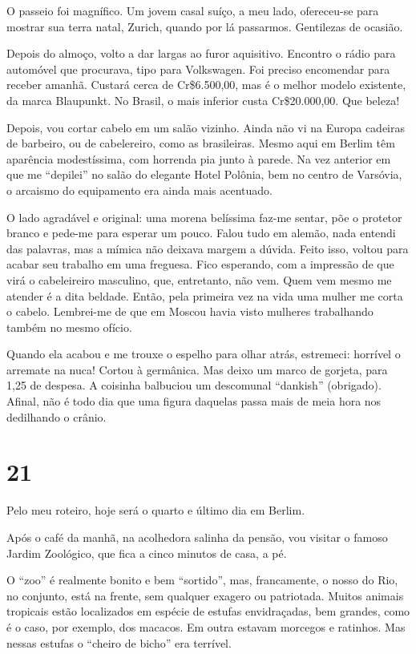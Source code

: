 O passeio foi magnífico. Um jovem casal suíço, a meu lado, ofereceu-se para mostrar sua terra natal, Zurich, quando por lá passarmos. Gentilezas de ocasião.

Depois do almoço, volto a dar largas ao furor aquisitivo. Encontro o rádio para automóvel que procurava, tipo para Volkswagen. Foi preciso encomendar para receber amanhã. Custará cerca de Cr\$6.500,00, mas é o melhor modelo existente, da marca Blaupunkt. No Brasil, o mais inferior custa Cr\$20.000,00. Que beleza!

Depois, vou cortar cabelo em um salão vizinho. Ainda não vi na Europa cadeiras de barbeiro, ou de cabelereiro, como as brasileiras. Mesmo aqui em Berlim têm aparência modestíssima, com horrenda pia junto à parede. Na vez anterior em que me ``depilei'' no salão do elegante Hotel Polônia, bem no centro de Varsóvia, o arcaismo do equipamento era ainda mais acentuado.

O lado agradável e original: uma morena belíssima faz-me sentar, põe o protetor branco e pede-me para esperar um pouco. Falou tudo em alemão, nada entendi das palavras, mas a mímica não deixava margem a dúvida. Feito isso, voltou para acabar seu trabalho em uma freguesa. Fico esperando, com a impressão de que virá o cabeleireiro masculino, que, entretanto, não vem. Quem vem mesmo me atender é a dita beldade. Então, pela primeira vez na vida uma mulher me corta o cabelo. Lembrei-me de que em Moscou havia visto mulheres trabalhando também no mesmo ofício.

Quando ela acabou e me trouxe o espelho para olhar atrás, estremeci: horrível o arremate na nuca! Cortou à germânica. Mas deixo um marco de gorjeta, para 1,25 de despesa. A coisinha balbuciou um descomunal ``dankish'' (obrigado). Afinal, não é todo dia que uma figura daquelas passa mais de meia hora nos dedilhando o crânio.

\section*{21 \adfflatleafright {}}
Pelo meu roteiro, hoje será o quarto e último dia em Berlim.

Após o café da manhã, na acolhedora salinha da pensão, vou visitar o famoso Jardim Zoológico, que fica a cinco minutos de casa, a pé.

O ``zoo'' é realmente bonito e bem ``sortido'', mas, francamente, o nosso do Rio, no conjunto, está na frente, sem qualquer exagero ou patriotada. Muitos animais tropicais estão localizados em espécie de estufas envidraçadas, bem grandes, como é o caso, por exemplo, dos macacos. Em outra estavam morcegos e ratinhos. Mas nessas estufas o ``cheiro de bicho'' era terrível.

